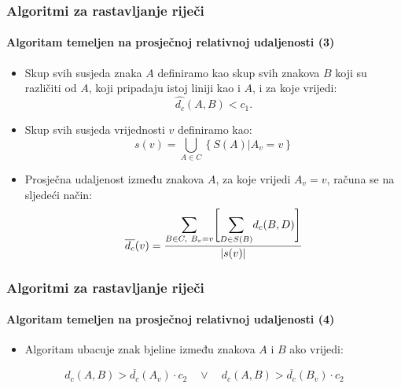 \documentclass{beamer}
\begin{document}
\begin{frame}
\frametitle{Algoritmi za rastavljanje riječi}
\framesubtitle{Algoritam temeljen na prosječnoj relativnoj udaljenosti (3)}
\begin{itemize}
    \item Skup svih susjeda znaka $A$ definiramo kao skup svih znakova $B$ koji
          su različiti od $A$, koji pripadaju istoj liniji kao i $A$, i za koje
          vrijedi:
    \begin{equation}
    \hat{d_c}(A, B) < c_1 \texttt{.}
    \end{equation}
    \item Skup svih susjeda vrijednosti $v$ definiramo kao:
    \begin{equation}
    s(v) = \bigcup\limits_{A \in C}\left\{S(A) \vert A_v = v\right\}
    \end{equation}
    \item Prosječna udaljenost između znakova $A$, za koje vrijedi
          $A_v = v$, računa se na sljedeći način:
    \begin{equation}
    \label{eq:relative-distance-02}
    \overline{d_c}(v) =
    \frac{
        \mathlarger{\sum}\limits_{B \in C,\ B_v = v}
        \Bigg[
        \mathlarger{\sum}\limits_{D \in S(B)} d_c(B, D)
        \Bigg]
    }{|s(v)|}
    \end{equation}
\end{itemize}
\end{frame}
\begin{frame}
\frametitle{Algoritmi za rastavljanje riječi}
\framesubtitle{Algoritam temeljen na prosječnoj relativnoj udaljenosti (4)}
\begin{itemize}
    \item Algoritam ubacuje znak bjeline između znakova $A$ i $B$ ako vrijedi:
\end{itemize}
\begin{equation}
\label{eq:relative-distance-03}
    d_c(A, B) > \overline{d_c}(A_v) \cdot c_2 \quad \lor \quad
    d_c(A, B) > \overline{d_c}(B_v) \cdot c_2
\end{equation}
\end{frame}
\end{document}
